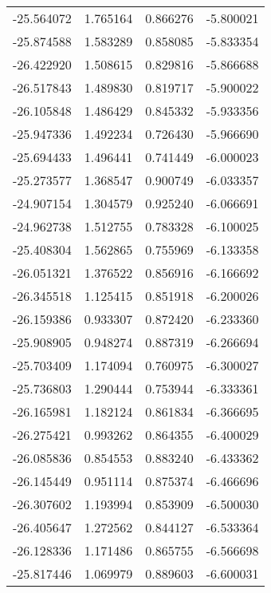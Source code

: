\begin{tabular}{rrrr}
      -25.564072 &         1.765164 &    0.866276 &  -5.800021 \\
      -25.874588 &         1.583289 &    0.858085 &  -5.833354 \\
      -26.422920 &         1.508615 &    0.829816 &  -5.866688 \\
      -26.517843 &         1.489830 &    0.819717 &  -5.900022 \\
      -26.105848 &         1.486429 &    0.845332 &  -5.933356 \\
      -25.947336 &         1.492234 &    0.726430 &  -5.966690 \\
      -25.694433 &         1.496441 &    0.741449 &  -6.000023 \\
      -25.273577 &         1.368547 &    0.900749 &  -6.033357 \\
      -24.907154 &         1.304579 &    0.925240 &  -6.066691 \\
      -24.962738 &         1.512755 &    0.783328 &  -6.100025 \\
      -25.408304 &         1.562865 &    0.755969 &  -6.133358 \\
      -26.051321 &         1.376522 &    0.856916 &  -6.166692 \\
      -26.345518 &         1.125415 &    0.851918 &  -6.200026 \\
      -26.159386 &         0.933307 &    0.872420 &  -6.233360 \\
      -25.908905 &         0.948274 &    0.887319 &  -6.266694 \\
      -25.703409 &         1.174094 &    0.760975 &  -6.300027 \\
      -25.736803 &         1.290444 &    0.753944 &  -6.333361 \\
      -26.165981 &         1.182124 &    0.861834 &  -6.366695 \\
      -26.275421 &         0.993262 &    0.864355 &  -6.400029 \\
      -26.085836 &         0.854553 &    0.883240 &  -6.433362 \\
      -26.145449 &         0.951114 &    0.875374 &  -6.466696 \\
      -26.307602 &         1.193994 &    0.853909 &  -6.500030 \\
      -26.405647 &         1.272562 &    0.844127 &  -6.533364 \\
      -26.128336 &         1.171486 &    0.865755 &  -6.566698 \\
      -25.817446 &         1.069979 &    0.889603 &  -6.600031 \\

\end{tabular}
